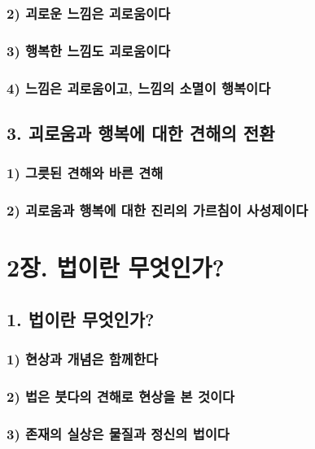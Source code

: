 \documentclass[12pt, a4paper, oneside]{book}
\begin{document}
	\section{2) 괴로운 느낌은 괴로움이다}
	\section{3) 행복한 느낌도 괴로움이다}
	\section{4) 느낌은 괴로움이고, 느낌의 소멸이 행복이다}

	\newpage
	\chapter{3. 괴로움과 행복에 대한 견해의 전환}
	\section{1) 그릇된 견해와 바른 견해}
	\section{2) 괴로움과 행복에 대한 진리의 가르침이 사성제이다}




	\part{2장. 법이란 무엇인가?}


	\newpage
	\chapter{1. 법이란 무엇인가?}
	\section{1) 현상과 개념은 함께한다}
	\section{2) 법은 붓다의 견해로 현상을 본 것이다}
	\section{3) 존재의 실상은 물질과 정신의 법이다}
\end{document}

